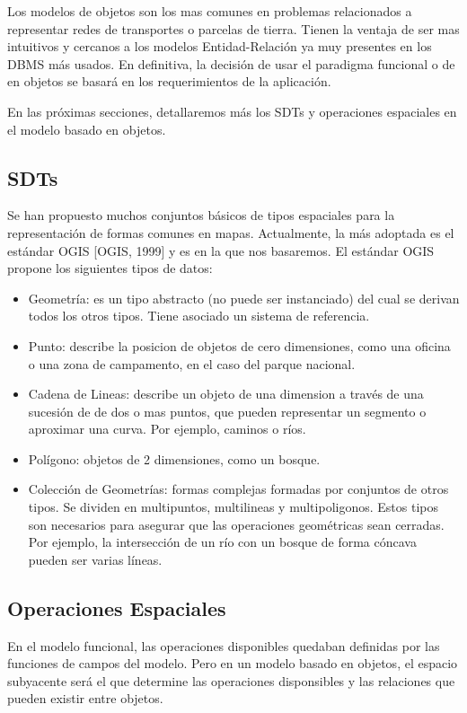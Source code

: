 Los modelos de objetos son los mas comunes en problemas relacionados a representar redes de transportes o parcelas de tierra. Tienen la ventaja de ser mas intuitivos y cercanos a los modelos Entidad-Relación ya muy presentes en los DBMS más usados. En definitiva, la decisión de usar el paradigma funcional o de en objetos se basará en los requerimientos de la aplicación.

En las próximas secciones, detallaremos más los SDTs y operaciones espaciales en el modelo basado en objetos.

\subsection{SDTs}
Se han propuesto muchos conjuntos básicos de tipos espaciales para la representación de formas comunes en mapas. Actualmente, la más adoptada es el estándar OGIS [OGIS, 1999] y es en la que nos basaremos.
El estándar OGIS propone los siguientes tipos de datos:
\begin{itemize}
    \item Geometría: es un tipo abstracto (no puede ser instanciado) del cual se derivan todos los otros tipos. Tiene asociado un sistema de referencia.
    \item Punto: describe la posicion de objetos de cero dimensiones, como una oficina o una zona de campamento, en el caso del parque nacional.
    \item Cadena de Lineas: describe un objeto de una dimension a través de una sucesión de de dos o mas puntos, que pueden representar un segmento o aproximar una curva. Por ejemplo, caminos o ríos.
    \item Polígono: objetos de 2 dimensiones, como un bosque.
    \item Colección de Geometrías: formas complejas formadas por conjuntos de otros tipos. Se dividen en multipuntos, multilineas y multipoligonos. Estos tipos son necesarios para asegurar que las operaciones geométricas sean cerradas. Por ejemplo, la intersección de un río con un bosque de forma cóncava pueden ser varias líneas.
\end{itemize}

\subsection{Operaciones Espaciales}

En el modelo funcional, las operaciones disponibles quedaban definidas por las funciones de campos del modelo. Pero en un modelo basado en objetos, el espacio subyacente será el que determine las operaciones disponsibles y las relaciones que pueden existir entre objetos. 

